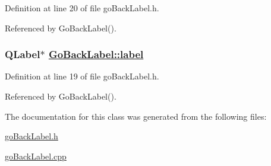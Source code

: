 Definition at line 20 of file go\-Back\-Label.h.

Referenced by Go\-Back\-Label().\hypertarget{classGoBackLabel_r0}{
\subsubsection[label]{\setlength{\rightskip}{0pt plus 5cm}QLabel$\ast$ \hyperlink{classGoBackLabel_r0}{Go\-Back\-Label::label}}}
\label{classGoBackLabel_r0}


Definition at line 19 of file go\-Back\-Label.h.

Referenced by Go\-Back\-Label().

The documentation for this class was generated from the following files:\begin{CompactItemize}
\item 
\hyperlink{goBackLabel_8h}{go\-Back\-Label.h}\item 
\hyperlink{goBackLabel_8cpp}{go\-Back\-Label.cpp}\end{CompactItemize}
